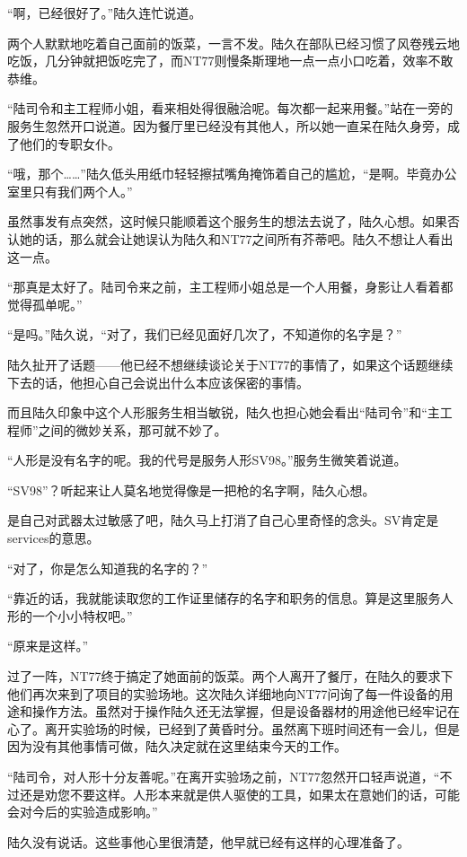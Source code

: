 “啊，已经很好了。”陆久连忙说道。

两个人默默地吃着自己面前的饭菜，一言不发。陆久在部队已经习惯了风卷残云地吃饭，几分钟就把饭吃完了，而NT77则慢条斯理地一点一点小口吃着，效率不敢恭维。

“陆司令和主工程师小姐，看来相处得很融洽呢。每次都一起来用餐。”站在一旁的服务生忽然开口说道。因为餐厅里已经没有其他人，所以她一直呆在陆久身旁，成了他们的专职女仆。

“哦，那个……”陆久低头用纸巾轻轻擦拭嘴角掩饰着自己的尴尬，“是啊。毕竟办公室里只有我们两个人。”

虽然事发有点突然，这时候只能顺着这个服务生的想法去说了，陆久心想。如果否认她的话，那么就会让她误认为陆久和NT77之间所有芥蒂吧。陆久不想让人看出这一点。

“那真是太好了。陆司令来之前，主工程师小姐总是一个人用餐，身影让人看着都觉得孤单呢。”

“是吗。”陆久说，“对了，我们已经见面好几次了，不知道你的名字是？”

陆久扯开了话题——他已经不想继续谈论关于NT77的事情了，如果这个话题继续下去的话，他担心自己会说出什么本应该保密的事情。

而且陆久印象中这个人形服务生相当敏锐，陆久也担心她会看出“陆司令”和“主工程师”之间的微妙关系，那可就不妙了。

“人形是没有名字的呢。我的代号是服务人形SV98。”服务生微笑着说道。

“SV98”？听起来让人莫名地觉得像是一把枪的名字啊，陆久心想。

是自己对武器太过敏感了吧，陆久马上打消了自己心里奇怪的念头。SV肯定是services的意思。

“对了，你是怎么知道我的名字的？”

“靠近的话，我就能读取您的工作证里储存的名字和职务的信息。算是这里服务人形的一个小小特权吧。”

“原来是这样。”

过了一阵，NT77终于搞定了她面前的饭菜。两个人离开了餐厅，在陆久的要求下他们再次来到了项目的实验场地。这次陆久详细地向NT77问询了每一件设备的用途和操作方法。虽然对于操作陆久还无法掌握，但是设备器材的用途他已经牢记在心了。离开实验场的时候，已经到了黄昏时分。虽然离下班时间还有一会儿，但是因为没有其他事情可做，陆久决定就在这里结束今天的工作。

“陆司令，对人形十分友善呢。”在离开实验场之前，NT77忽然开口轻声说道，“不过还是劝您不要这样。人形本来就是供人驱使的工具，如果太在意她们的话，可能会对今后的实验造成影响。”

陆久没有说话。这些事他心里很清楚，他早就已经有这样的心理准备了。

